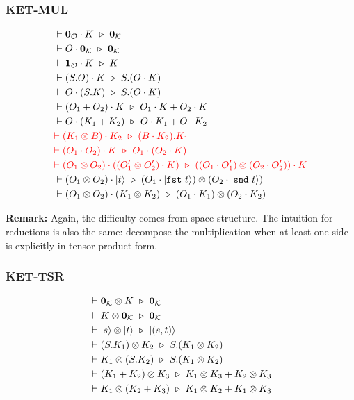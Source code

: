 \subsubsection*{\textsf{KET-MUL}}
\begin{align*}
  & \vdash \textbf{0}_\mathcal{O} \cdot K \ \triangleright\  \textbf{0}_\mathcal{K} \\
  & \vdash O \cdot \mathbf{0}_{\mathcal{K}} \ \triangleright\  \mathbf{0}_{\mathcal{K}} \\
  & \vdash \textbf{1}_\mathcal{O} \cdot K \ \triangleright\  K \\
  & \vdash (S.O) \cdot K \ \triangleright\  S.(O \cdot K) \\
  & \vdash O \cdot (S.K) \ \triangleright\  S.(O \cdot K) \\
  & \vdash (O_1 + O_2) \cdot K \ \triangleright\  O_1 \cdot K + O_2 \cdot K \\
  & \vdash O \cdot (K_1 + K_2) \ \triangleright\  O \cdot K_1 + O \cdot K_2 \\
  & \textcolor{red}{\vdash (K_1 \otimes B) \cdot K_2 \ \triangleright\  (B \cdot K_2).K_1} \\
  & \textcolor{red}{\vdash (O_1 \cdot O_2) \cdot K \ \triangleright\  O_1 \cdot (O_2 \cdot K)} \\
  & \textcolor{red}{\vdash (O_1 \otimes O_2) \cdot ((O_1' \otimes O_2') \cdot K) \ \triangleright\  ((O_1 \cdot O_1') \otimes (O_2 \cdot O_2')) \cdot K} \\
  & \vdash (O_1 \otimes O_2) \cdot |t\rangle \ \triangleright\  (O_1 \cdot |\texttt{fst}\ t\rangle) \otimes (O_2 \cdot |\texttt{snd}\ t\rangle) \\
  & \vdash (O_1 \otimes O_2) \cdot (K_1 \otimes K_2) \ \triangleright\  (O_1 \cdot K_1) \otimes (O_2 \cdot K_2)
\end{align*}

\textbf{Remark: } Again, the difficulty comes from space structure. The intuition for reductions is also the same: decompose the multiplication when at least one side is explicitly in tensor product form.


\subsubsection*{\textsf{KET-TSR}}
\begin{align*}
  & \vdash \mathbf{0}_\mathcal{K} \otimes K \ \triangleright\  \mathbf{0}_\mathcal{K} \\
  & \vdash K \otimes \mathbf{0}_\mathcal{K} \ \triangleright\  \mathbf{0}_\mathcal{K} \\
  & \vdash |s\rangle \otimes |t\rangle\ \triangleright\ |(s, t)\rangle \\
  & \vdash (S.K_1) \otimes K_2 \ \triangleright\  S.(K_1 \otimes K_2) \\
  & \vdash K_1 \otimes (S.K_2) \ \triangleright\  S.(K_1 \otimes K_2) \\
  & \vdash (K_1 + K_2) \otimes K_3 \ \triangleright\  K_1 \otimes K_3 + K_2 \otimes K_3 \\
  & \vdash K_1 \otimes (K_2 + K_3) \ \triangleright\  K_1 \otimes K_2 + K_1 \otimes K_3
\end{align*}

